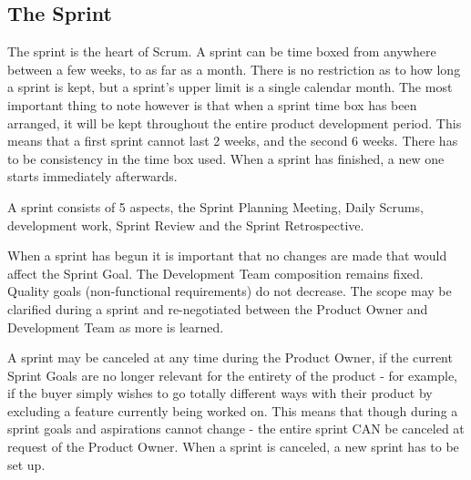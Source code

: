 \subsection{The Sprint}

The sprint is the heart of Scrum. A sprint can be time boxed from anywhere 
between a few weeks, to as far as a month. There is no restriction as to how 
long a sprint is kept, but a sprint's upper limit is a single calendar 
month\cite{scrumguide11}. The most important thing to note however is that 
when a sprint time box has been arranged, it will be kept throughout the 
entire product development period\cite{scrumguide11}. This means that a 
first sprint cannot last 2 weeks, and the second 6 weeks. There has to be 
consistency in the time box used\cite{scrumguide11}. When a sprint has 
finished, a new one starts immediately afterwards\cite{scrumguide11}.


A sprint consists of 5 aspects, the Sprint Planning Meeting, Daily Scrums, 
development work, Sprint Review and the Sprint Retrospective\cite{scrumguide11}. 


When a sprint has begun it is important that no changes are made that would 
affect the Sprint Goal\cite{scrumguide11}. The Development Team composition 
remains fixed. Quality goals (non-functional requirements) do not 
decrease\cite{scrumguide11}. The scope may be clarified during a sprint and 
re-negotiated between the Product Owner and Development Team as more is 
learned\cite{scrumguide11}. 


A sprint may be canceled at any time during the Product Owner, if the current 
Sprint Goals are no longer relevant for the entirety of the product - for 
example, if the buyer simply wishes to go totally different ways with their 
product by excluding a feature currently being worked on\cite{scrumguide11}. 
This means that though during a sprint goals and aspirations cannot change - 
the entire sprint CAN be canceled at request of the Product 
Owner\cite{scrumguide11}. When a sprint is canceled, a new sprint has to be 
set up\cite{scrumguide11}.



